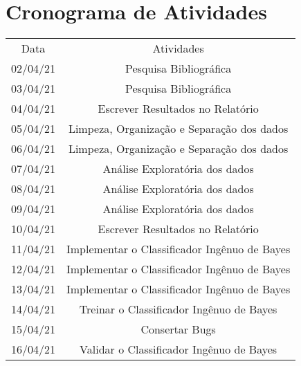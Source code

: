 \documentclass[conference]{IEEEtran}
\begin{document}
\clearpage
\section*{Cronograma de Atividades}
\begin{table}[!ht]
	\centering
    \begin{small}
        \begin{tabular}{cc}
        	\\
        	\\
            \hline
            Data                    & Atividades\\
            \hline
            02/04/21                & Pesquisa Bibliográfica \\
            03/04/21                & Pesquisa Bibliográfica \\
            04/04/21                & Escrever Resultados no Relatório \\
            05/04/21                & Limpeza, Organização e Separação dos dados \\
            06/04/21                & Limpeza, Organização e Separação dos dados \\
            07/04/21                & Análise Exploratória dos dados \\
            08/04/21                & Análise Exploratória dos dados\\
            09/04/21                & Análise Exploratória dos dados\\
            10/04/21                & Escrever Resultados no Relatório\\
            11/04/21                & Implementar o Classificador Ingênuo de Bayes\\
            12/04/21                & Implementar o Classificador Ingênuo de Bayes\\
            13/04/21                & Implementar o Classificador Ingênuo de Bayes\\
            14/04/21                & Treinar o Classificador Ingênuo de Bayes\\
            15/04/21                & Consertar Bugs\\
            16/04/21                & Validar o Classificador Ingênuo de Bayes\\

\end{tabular}
\end{small}
\end{table}
\end{document}
